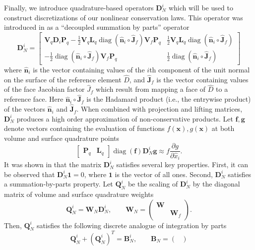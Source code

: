 \documentclass[preprint,10pt]{article}
\theoremstyle{definition}
\theoremstyle{lemma}
\theoremstyle{theorem}
\theoremstyle{assumption}
\DeclareMathOperator{\diag}{diag}
\renewcommand{\hat}{\widehat}
\newcommand{\pd}[2]{\frac{\partial#1}{\partial#2}}
\newcommand{\LRp}[1]{\left( #1 \right)}
\newcommand{\LRs}[1]{\left[ #1 \right]}
\begin{document}
{Finally, we introduce quadrature-based operators $\bm{D}_N^i$ which will be used to construct discretizations of our nonlinear conservation laws.  This operator was introduced in \cite{chan2017discretely} as a ``decoupled summation by parts'' operator
\begin{equation}
\bm{D}_N^i =\LRs{
\begin{array}{cc}
\bm{V}_q\bm{D}_i \bm{P}_q - \frac{1}{2}\bm{V}_q\bm{L}_q \diag\LRp{\hat{\bm{n}}_i\circ\bm{\hat{J}}_f}\bm{V}_f\bm{P}_q & \frac{1}{2}\bm{V}_q\bm{L}_q  \diag\LRp{\hat{\bm{n}}_i\circ\bm{\hat{J}}_f}\\
- \frac{1}{2}\diag\LRp{\hat{\bm{n}}_i\circ\bm{\hat{J}}_f} \bm{V}_f\bm{P}_q &  \frac{1}{2}\diag\LRp{\hat{\bm{n}}_i\circ\bm{\hat{J}}_f}
\end{array}
}
\label{eq:decoupledsbp}
\end{equation}
where $\hat{\bm{n}}_i$ is the vector containing values of the $i$th component of the unit normal on the surface of the reference element $\hat{D}$, and $\bm{\hat{J}}_f$ is the vector containing values of the face Jacobian factor $\hat{J}_f$ which result from mapping a face of $\hat{D}$ to a reference face.  Here $\hat{\bm{n}}_i\circ\bm{\hat{J}}_f$ is the Hadamard product (i.e., the entrywise product) of the vectors $\hat{\bm{n}}_i$ and $\bm{\hat{J}}_f$.  When combined with projection and lifting matrices, $\bm{D}_N^i$ produces a high order approximation of non-conservative products.  Let $\bm{f},\bm{g}$ denote vectors containing the evaluation of functions $f(\bm{x}),g(\bm{x})$ at both volume and surface quadrature points
\[
\LRs{\begin{array}{cc}\bm{P}_q & \bm{L}_q\end{array}} \diag\LRp{\bm{f}}\bm{D}_N^i \bm{g} \approx f\pd{g}{\hat{x}_i}.
\]
It was shown in \cite{chan2017discretely} that the matrix $\bm{D}_N^i$ satisfies several key properties.  First, it can be observed that $\bm{D}_N^i\bm{1} = 0$, where $\bm{1}$ is the vector of all ones.  Second, $\bm{D}_N^i$ satisfies a summation-by-parts property.  Let $\bm{Q}_N^i$ be the scaling of $\bm{D}_N^i$ by the diagonal matrix of volume and surface quadrature weights 
\[
\bm{Q}_N^i = \bm{W}_N \bm{D}_N^i, \qquad \bm{W}_N = \LRp{\begin{array}{cc}
\bm{W} &\\
& \bm{W}_f 
\end{array}}.
\]
Then, $\bm{Q}_N^i$ satisfies the following discrete analogue of integration by parts 
\begin{equation}
\bm{Q}_N^i + \LRp{\bm{Q}_N^i}^T = \bm{B}^i_N, \qquad \bm{B}_N = \LRp{\begin{array}{cc}

\end{array}}
\end{equation}}
\end{document}
